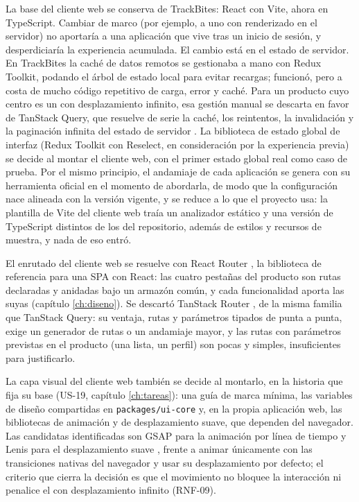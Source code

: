 La base del cliente web se conserva de TrackBites: React con Vite, ahora en TypeScript.
Cambiar de marco (por ejemplo, a uno con renderizado en el servidor) no aportaría a una aplicación que vive tras un inicio de sesión, y desperdiciaría la experiencia acumulada.
El cambio está en el estado de servidor.
En TrackBites la caché de datos remotos se gestionaba a mano con Redux Toolkit, podando el árbol de estado local para evitar recargas; funcionó, pero a costa de mucho código repetitivo de carga, error y caché.
Para un producto cuyo centro es un  con desplazamiento infinito, esa gestión manual se descarta en favor de TanStack Query, que resuelve de serie la caché, los reintentos, la invalidación y la paginación infinita del estado de servidor \parencite{tanstack-query-docs}.
La biblioteca de estado global de interfaz (Redux Toolkit con Reselect, en consideración por la experiencia previa) se decide al montar el cliente web, con el primer estado global real como caso de prueba.
Por el mismo principio, el andamiaje de cada aplicación se genera con su herramienta oficial en el momento de abordarla, de modo que la configuración nace alineada con la versión vigente, y se reduce a lo que el proyecto usa: la plantilla de Vite del cliente web traía un analizador estático y una versión de TypeScript distintos de los del repositorio, además de estilos y recursos de muestra, y nada de eso entró.

El enrutado del cliente web se resuelve con React Router \parencite{react-router-docs}, la biblioteca de referencia para una \ac{SPA} con React: las cuatro pestañas del producto son rutas declaradas y anidadas bajo un armazón común, y cada funcionalidad aporta las suyas (capítulo \ref{ch:diseno}).
Se descartó TanStack Router \parencite{tanstack-router-docs}, de la misma familia que TanStack Query: su ventaja, rutas y parámetros tipados de punta a punta, exige un generador de rutas o un andamiaje mayor, y las rutas con parámetros previstas en el producto (una lista, un perfil) son pocas y simples, insuficientes para justificarlo.

La capa visual del cliente web también se decide al montarlo, en la historia que fija su base (US-19, capítulo \ref{ch:tareas}): una guía de marca mínima, las variables de diseño compartidas en \texttt{packages/ui-core} y, en la propia aplicación web, las bibliotecas de animación y de desplazamiento suave, que dependen del navegador.
Las candidatas identificadas son GSAP para la animación por línea de tiempo \parencite{gsap-docs} y Lenis para el desplazamiento suave \parencite{lenis-docs}, frente a animar únicamente con las transiciones nativas del navegador y usar su desplazamiento por defecto; el criterio que cierra la decisión es que el movimiento no bloquee la interacción ni penalice el  con desplazamiento infinito (RNF-09).

